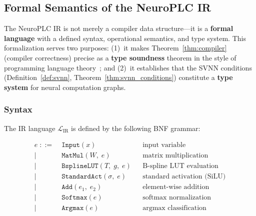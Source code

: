 \subsection{Formal Semantics of the NeuroPLC IR}
\label{sec:ir-semantics}

The NeuroPLC IR is not merely a compiler data structure---it is a
\textbf{formal language} with a defined syntax, operational semantics,
and type system. This formalization serves two purposes:
(1)~it makes Theorem~\ref{thm:compiler} (compiler correctness)
precise as a \textbf{type soundness} theorem in the style of programming
language theory~\cite{milner1978theory,pierce2002types}; and
(2)~it establishes that the SVNN conditions
(Definition~\ref{def:svnn}, Theorem~\ref{thm:svnn_conditions}) constitute
a \textbf{type system} for neural computation graphs.

\subsubsection{Syntax}

The IR language $\mathcal{L}_{\text{IR}}$ is defined by the following BNF grammar:

\begin{equation}
\begin{aligned}
e \;::=&\; \texttt{Input}(x)                                    &&\text{input variable} \\
\mid&\; \texttt{MatMul}(W,\; e)                                  &&\text{matrix multiplication} \\
\mid&\; \texttt{BsplineLUT}(T,\; g,\; e)                         &&\text{B-spline LUT evaluation} \\
\mid&\; \texttt{StandardAct}(\sigma,\; e)                        &&\text{standard activation (SiLU)} \\
\mid&\; \texttt{Add}(e_1,\; e_2)                                 &&\text{element-wise addition} \\
\mid&\; \texttt{Softmax}(e)                                      &&\text{softmax normalization} \\
\mid&\; \texttt{Argmax}(e)                                       &&\text{argmax classification}
\end{aligned}
\label{eq:ir_bnf}
\end{equation}

